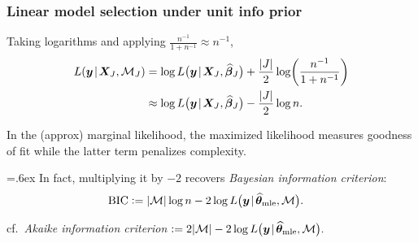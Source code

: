 \documentclass[18pt]{beamer}
\newcommand{\defineTightSpacing}{%
	\setlength{\abovedisplayskip}{.25\baselineskip}%
	\setlength{\belowdisplayskip}{.25\baselineskip}%
}
\newcommand{\given}{\mskip.7\thinmuskip | \mskip.7\thinmuskip}
\newcommand{\defeq}{\vcentcolon =} %
\newcommand{\mle}[1]{\widehat{#1}_{\textrm{mle}}}
\newcommand{\likelihood}{L}
\newcommand{\by}{\bm{y}}
\newcommand{\bX}{\bm{X}}
\newcommand{\bbeta}{\bm{\beta}}
\newcommand{\btheta}{\bm{\theta}}
\newcommand{\model}{\mathcal{M}}
\newcommand{\nonzeroCoefSet}{J}
\begin{document}
\begin{frame}
\frametitle{Linear model selection under unit info prior}
Taking logarithms and applying $\frac{n^{-1}}{1 + n^{-1}} \approx n^{-1}$,
\begin{equation*} \defineTightSpacing%
\begin{aligned}
\likelihood(\by \given \bX_\nonzeroCoefSet, \model_\nonzeroCoefSet)
	&= \log \likelihood\big( \by \given \bX_\nonzeroCoefSet, \widehat{\bbeta}_\nonzeroCoefSet \big) 
		+ \frac{| \nonzeroCoefSet |}{2} \log \! \left( \frac{n^{-1}}{1 + n^{-1}} \right) \\
	&\approx \log \likelihood\big( \by \given \bX_\nonzeroCoefSet, \widehat{\bbeta}_\nonzeroCoefSet \big) 
		- \frac{| \nonzeroCoefSet |}{2} \log n.
\end{aligned}
\end{equation*}

In the (approx) marginal likelihood, the maximized likelihood measures goodness of fit while the latter term penalizes complexity.

{\font=.6ex 
In fact, multiplying it by $- 2$ recovers \textit{Bayesian information criterion}:
}%
\begin{equation*} \defineTightSpacing%
\begin{aligned}
\textrm{BIC} 
	&\defeq | \model | \log n - 2 \log \likelihood\big( \by \given \mle{\btheta}, \model  \big).
\end{aligned}
\end{equation*}

cf.\ \textit{Akaike information criterion} $\defeq 2 | \model | - 2 \log \likelihood\big( \by \given \mle{\btheta}, \model  \big).$
\end{frame}
\end{document}
